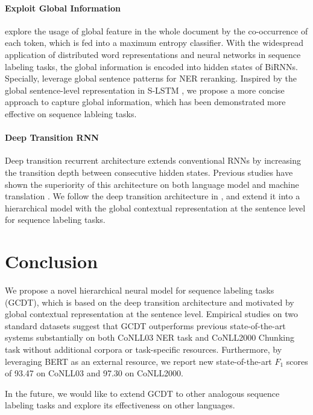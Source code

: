 \documentclass[11pt,a4paper]{article}
\begin{document}
\paragraph{Exploit Global Information}
\citeauthor{global_information}  explore the usage of global feature in the whole document by the co-occurrence of each token, which is fed into a maximum entropy classifier.
With the widespread application of distributed word representations \cite{word2vec} and neural networks \cite{collobert2011,BLSTM+CRF} in sequence labeling tasks, the global information is encoded into hidden states of BiRNNs. Specially, \citeauthor{reranking}  leverage global sentence patterns for NER reranking. Inspired by the global sentence-level representation in S-LSTM \cite{SLSTM}, we propose a more concise approach to capture global information,  which has been demonstrated more effective on sequence lableing tasks.

\paragraph{Deep Transition RNN}
Deep transition recurrent architecture extends conventional RNNs by increasing the transition depth between consecutive hidden states. Previous studies have shown the superiority of this architecture on both language model \cite{DT_language_model} and machine translation \cite{DT_machine_translation,DTMT}. We follow the deep transition architecture in \cite{DTMT}, and extend it into a hierarchical model with the global contextual representation at the sentence level for sequence labeling tasks.

\section{Conclusion}
We propose a novel hierarchical neural model for sequence labeling tasks (GCDT), which is based on the deep transition architecture and motivated by global contextual representation at the sentence level. Empirical studies on two standard datasets suggest that GCDT outperforms previous state-of-the-art systems substantially on both CoNLL03 NER task and CoNLL2000 Chunking task without additional corpora or task-specific resources. Furthermore, by leveraging BERT as an external resource, we report new state-of-the-art $F_1$ scores of 93.47 on CoNLL03 and 97.30 on CoNLL2000.

In the future, we would like to extend GCDT to other analogous sequence labeling tasks and explore its effectiveness on other languages.
\end{document}
